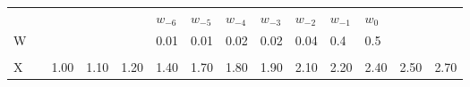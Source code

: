 \begin{frame}
\begin{columns}
\begin{overlayarea}{\textwidth}{\textheight}
\begin{minipage}[t]{0.25\textwidth}
{\begin{table}[h]
{\begin{tabular}{p{0.1cm}p{0.1cm}p{0.1cm}p{0.1cm}p{0.1cm}p{0.1cm}p{0.1cm}p{0.1cm}p{0.1cm}p{0.1cm}p{0.1cm}p{0.1cm}p{0.1cm}p{0.1cm}}
								                     &                       &                           &                           &                           & $w_{-6}$                  & $w_{-5}$                  & $w_{-4}$                                         & $w_{-3}$                                         & $w_{-2}$                                         & $w_{-1}$                                         & $w_{0}$                                          &                                                  &                                                  \\ \cline{8-12}
								\cline{6-12}
								W                    &                       &                           &                           & \multicolumn{1}{c|}{}     & \multicolumn{1}{c|}{0.01} & \multicolumn{1}{c|}{0.01} & \multicolumn{1}{c|}{0.02}                        & \multicolumn{1}{c|}{0.02}                        & \multicolumn{1}{c|}{0.04}                        & \multicolumn{1}{l|}{0.4}                         & \multicolumn{1}{l|}{0.5}                         &                                                  &                                                  \\ \cline{6-12}
								\multicolumn{1}{l}{} &                       & \multicolumn{1}{l}{}      & \multicolumn{1}{l}{}      & \multicolumn{1}{l}{}      & \multicolumn{1}{l}{}      & \multicolumn{1}{l}{}      & \multicolumn{1}{l}{}                             & \multicolumn{1}{l}{}                             & \multicolumn{1}{l}{}                             &                                                  &                                                  &                                                  &                                                  \\ \cline{3-14} 
								X                    & \multicolumn{1}{l|}{} & \multicolumn{1}{c|}{1.00} & \multicolumn{1}{c|}{1.10} & \multicolumn{1}{c|}{1.20} & \multicolumn{1}{c|}{1.40} & \multicolumn{1}{c|}{1.70} & \multicolumn{1}{c|}{1.80}                        & \multicolumn{1}{c|}{1.90}                        & \multicolumn{1}{c|}{2.10}                        & \multicolumn{1}{c|}{2.20}                        & \multicolumn{1}{c|}{2.40}                        & \multicolumn{1}{c|}{2.50}                        & \multicolumn{1}{c|}{2.70}                        \\ \cline{3-14} 

\end{tabular}}
\end{table}}
\end{minipage}
\end{overlayarea}
\end{columns}
\end{frame}
